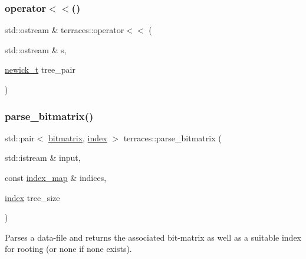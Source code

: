 \mbox{\label{namespaceterraces_ad3526c917cfcc4424c9a1cac266e6f9f}} 
\subsubsection{\texorpdfstring{operator$<$$<$()}{operator<<()}\hspace{0.1cm}{\footnotesize\ttfamily [7/7]}}
{\footnotesize\ttfamily std\+::ostream \& terraces\+::operator$<$$<$ (\begin{DoxyParamCaption}\item[{std\+::ostream \&}]{s,  }\item[{\hyperlink{structterraces_1_1newick__t}{newick\+\_\+t}}]{tree\+\_\+pair }\end{DoxyParamCaption})}

\mbox{\label{namespaceterraces_af52559863b67502f00d68853f50c69af}} 
\subsubsection{\texorpdfstring{parse\+\_\+bitmatrix()}{parse\_bitmatrix()}}
{\footnotesize\ttfamily std\+::pair$<$ \hyperlink{classterraces_1_1bitmatrix}{bitmatrix}, \hyperlink{namespaceterraces_adbc33ccb543d1634e96d0eb02e472c77}{index} $>$ terraces\+::parse\+\_\+bitmatrix (\begin{DoxyParamCaption}\item[{std\+::istream \&}]{input,  }\item[{const \hyperlink{namespaceterraces_a148f3e895119c2a72d995caae669e40d}{index\+\_\+map} \&}]{indices,  }\item[{\hyperlink{namespaceterraces_adbc33ccb543d1634e96d0eb02e472c77}{index}}]{tree\+\_\+size }\end{DoxyParamCaption})}

Parses a data-\/file and returns the associated bit-\/matrix as well as a suitable index for rooting (or {\ttfamily none} if none exists). \mbox{\label{namespaceterraces_add61915a31828774ee0371d443031c29}} 
